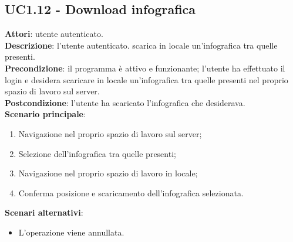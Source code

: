 \subsection{UC1.12 - Download infografica}{
	\label{uc1.12}
	\textbf{Attori}: utente autenticato.\\
	\textbf{Descrizione}: l'utente autenticato. scarica in locale un'infografica tra quelle presenti.\\
	\textbf{Precondizione}: il programma è attivo e funzionante; l'utente ha effettuato il login e desidera scaricare in locale un'infografica tra quelle presenti nel proprio spazio di lavoro sul server.	\\
	\textbf{Postcondizione}: l'utente ha scaricato l'infografica che desiderava.\\
	\textbf{Scenario principale}:
	\begin{enumerate}
		\item Navigazione nel proprio spazio di lavoro sul server;
		\item Selezione dell'infografica tra quelle presenti;
		\item Navigazione nel proprio spazio di lavoro in locale;
		\item Conferma posizione e scaricamento dell'infografica selezionata.
		\end{enumerate}	
	\textbf{Scenari alternativi}:
	\begin{itemize}
		\item L'operazione viene annullata.
	\end{itemize}
	}
